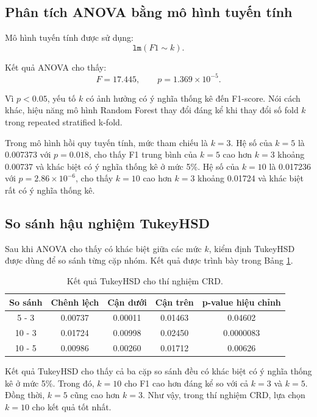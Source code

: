 \documentclass[12pt,a4paper]{article}
\begin{document}
\subsection{Phân tích ANOVA bằng mô hình tuyến tính}

Mô hình tuyến tính được sử dụng:
\[
\texttt{lm}(F1 \sim k).
\]

Kết quả ANOVA cho thấy:
\[
F = 17.445, \qquad p = 1.369 \times 10^{-5}.
\]

Vì $p < 0.05$, yếu tố $k$ có ảnh hưởng có ý nghĩa thống kê đến F1-score. Nói cách khác, hiệu năng mô hình Random Forest thay đổi đáng kể khi thay đổi số fold $k$ trong repeated stratified k-fold.

Trong mô hình hồi quy tuyến tính, mức tham chiếu là $k=3$. Hệ số của $k=5$ là 0.007373 với $p = 0.018$, cho thấy F1 trung bình của $k=5$ cao hơn $k=3$ khoảng 0.00737 và khác biệt có ý nghĩa thống kê ở mức 5\%. Hệ số của $k=10$ là 0.017236 với $p = 2.86 \times 10^{-6}$, cho thấy $k=10$ cao hơn $k=3$ khoảng 0.01724 và khác biệt rất có ý nghĩa thống kê.

\subsection{So sánh hậu nghiệm TukeyHSD}

Sau khi ANOVA cho thấy có khác biệt giữa các mức $k$, kiểm định TukeyHSD được dùng để so sánh từng cặp nhóm. Kết quả được trình bày trong Bảng \ref{tab:crd_tukey}.

\begin{table}[H]
    \centering
    \caption{Kết quả TukeyHSD cho thí nghiệm CRD.}
    \label{tab:crd_tukey}
    \begin{tabular}{ccccc}
        \toprule
        So sánh & Chênh lệch & Cận dưới & Cận trên & p-value hiệu chỉnh \\
        \midrule
        5 - 3   & 0.00737 & 0.00011 & 0.01463 & 0.04602 \\
        10 - 3  & 0.01724 & 0.00998 & 0.02450 & 0.0000083 \\
        10 - 5  & 0.00986 & 0.00260 & 0.01712 & 0.00626 \\
        \bottomrule
    \end{tabular}
\end{table}

Kết quả TukeyHSD cho thấy cả ba cặp so sánh đều có khác biệt có ý nghĩa thống kê ở mức 5\%. Trong đó, $k=10$ cho F1 cao hơn đáng kể so với cả $k=3$ và $k=5$. Đồng thời, $k=5$ cũng cao hơn $k=3$. Như vậy, trong thí nghiệm CRD, lựa chọn $k=10$ cho kết quả tốt nhất.
\end{document}

